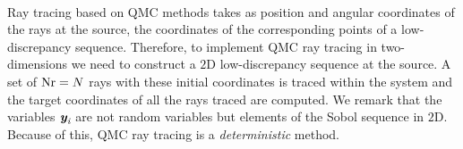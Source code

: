 \\ \indent Ray tracing based on QMC methods takes as position and angular coordinates of the rays at the source, the coordinates of the corresponding points of a low-discrepancy sequence. 
Therefore, to implement QMC ray tracing in two-dimensions we need to construct a $2$D low-discrepancy sequence at the source.  
 A set of $\textrm{Nr} = N$ rays with these initial coordinates is traced within the system and the target coordinates of all the rays traced are computed. We remark that the variables $\textit{\textbf{y}}_{\textit{i}}$ are not random variables but elements of the Sobol sequence in $2$D. Because of this, QMC ray tracing is a \textit{deterministic} method.\\ \indent 
